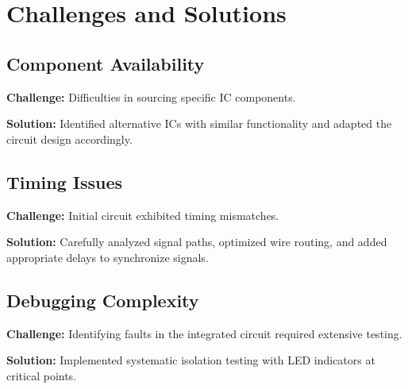 \section{Challenges and Solutions}

\subsection{Component Availability}
\textbf{Challenge:} Difficulties in sourcing specific IC components.

\textbf{Solution:} Identified alternative ICs with similar functionality and adapted the circuit design accordingly.

\subsection{Timing Issues}
\textbf{Challenge:} Initial circuit exhibited timing mismatches.

\textbf{Solution:} Carefully analyzed signal paths, optimized wire routing, and added appropriate delays to synchronize signals.

\subsection{Debugging Complexity}
\textbf{Challenge:} Identifying faults in the integrated circuit required extensive testing.

\textbf{Solution:} Implemented systematic isolation testing with LED indicators at critical points.
